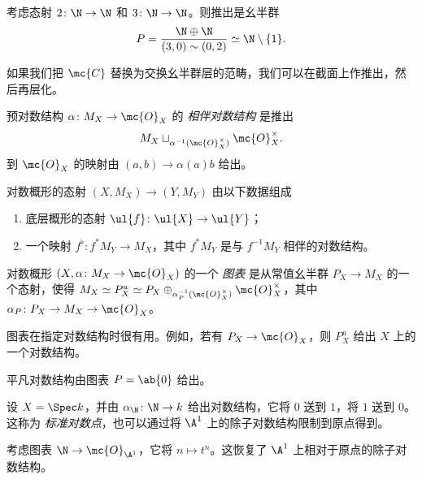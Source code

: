\begin{exm}
    考虑态射 \(2 \colon \N \to \N\) 和 \(3 \colon \N \to \N\)。则推出是幺半群
    \[ P = \frac{\N \oplus \N}{(3, 0) \sim (0,2)} \simeq \N \setminus \{1\}. \]
\end{exm}

如果我们把 \(\mc{C}\) 替换为交换幺半群层的范畴，我们可以在截面上作推出，然后再层化。

\begin{defn}
    预对数结构 \(\alpha \colon M_X \to \mc{O}_X\) 的 \textit{相伴对数结构} 是推出
    \[ M_X \sqcup_{\alpha^{-1}(\mc{O}_X^{\times})} \mc{O}_X^{\times}. \]
    到 \(\mc{O}_X\) 的映射由 \((a,b) \to \alpha(a) b\) 给出。
\end{defn}

\begin{defn}
    对数概形的态射 \((X, M_X) \to (Y, M_Y)\) 由以下数据组成
    \begin{enumerate}
        \item 底层概形的态射 \(\ul{f} \colon \ul{X} \to \ul{Y}\)；
        \item 一个映射 \(f^{\flat} \colon f^* M_Y \to M_X\)，其中 \(f^* M_Y\) 是与 \(f^{-1} M_Y\) 相伴的对数结构。
    \end{enumerate}
\end{defn}

\begin{defn}
    对数概形 \((X, \alpha \colon M_X \to \mc{O}_X)\) 的一个 \textit{图表} 是从常值幺半群 \(P_X \to M_X\) 的一个态射，使得 \(M_X \simeq P_X^a \simeq P_X \oplus_{\alpha_P^{-1}(\mc{O}_X^{\times})} \mc{O}_X^{\times}\)，其中 \(\alpha_P \colon P_X \to M_X \to \mc{O}_X\)。
\end{defn}

图表在指定对数结构时很有用。例如，若有 \(P_X \to \mc{O}_X\)，则 \(P_X^a\) 给出 \(X\) 上的一个对数结构。

\begin{exm}
    平凡对数结构由图表 \(P = \ab\{0\}\) 给出。
\end{exm}

\begin{exm}
    设 \(X = \Spec k\)，并由 \(\alpha_{\N} \colon \N \to k\) 给出对数结构，它将 \(0\) 送到 \(1\)，将 \(1\) 送到 \(0\)。这称为 \textit{标准对数点}，也可以通过将 \(\A^1\) 上的除子对数结构限制到原点得到。
\end{exm}

\begin{exm}
    考虑图表 \(\N \to \mc{O}_{\A^1}\)，它将 \(n \mapsto t^n\)。这恢复了 \(\A^1\) 上相对于原点的除子对数结构。
\end{exm}

